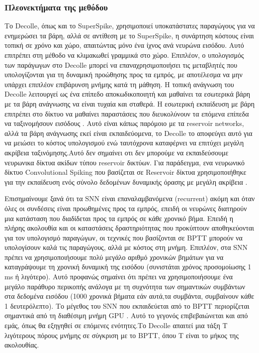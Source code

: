 \documentclass[12pt]{report}
\begin{document}
\subsubsection{Πλεονεκτήματα της μεθόδου}
Το \textlatin{Decolle}, όπως και το \textlatin{SuperSpike}, χρησιμοποιεί υποκατάστατες παραγώγους για να ενημερώσει τα βάρη, αλλά σε αντίθεση με το \textlatin{SuperSpike}, η συνάρτηση κόστους είναι τοπική σε χρόνο και χώρο, απαιτώντας μόνο ένα ίχνος ανά νευρώνα εισόδου. Αυτό επιτρέπει στη μέθοδο να κλιμακωθεί γραμμικά στο χώρο. Επιπλέον, ο υπολογισμός των παράγωγων στο Decolle μπορεί να επαναχρησιμοποιήσει τις μεταβλητές που υπολογίζονται για τη δυναμική προώθησης προς τα εμπρός, με αποτέλεσμα να μην υπάρχει επιπλέον επιβάρυνση μνήμης κατά τη μάθηση. Η τοπική ανάγνωση του Decolle λειτουργεί ως ένα επίπεδο αποκωδικοποιητή και μαθαίνει τα εσωτερικά βάρη με τα βάρη ανάγνωσης να είναι τυχαία και σταθερά. Η εσωτερική εκπαίδευση με βάρη επιτρέπει στο δίκτυο να μαθαίνει παραστάσεις που διευκολύνουν τα επόμενα επίπεδα να ταξινομήσουν εισόδους \cite{neftci2017}. Αυτό είναι κάπως παρόμοιο με τα reservoir networks, αλλά τα βάρη ανάγνωσης εκεί είναι εκπαιδεύομενα, το Decolle το αποφεύγει αυτό για να μειώσει το κόστος υπολογισμού ενώ ταυτόχρονα καταφέρνει να επιτύχει μεγάλη ακρίβεια ταξινόμησης.Αυτό δεν σημαίνει οτι δεν μπορούμε να εκπαιδεύσουμε νευρωνικα δίκτυα ακίδων τύπου \textlatin{reservoir} δικτύων. Για παράδειγμα, ενα νευρωνικό δίκτυο \textlatin{Convolutional Spiking} που βασίζεται σε \textlatin{Reservoir} δίκτυα χρησιμοποιήθηκε για την εκπαίδευση ενός σύνολο δεδομένων δυναμικής όρασης με μεγάλη ακρίβεια \cite{george2020}.

Επισημαίνουμε ξανά ότι τα \textlatin{SNN} είναι επαναλαμβανόμενα (\textlatin{recurrent}) ακόμη και όταν όλες οι συνδέσεις είναι προωθημένες προς τα εμπρός, επειδή οι νευρώνες διατηρούν μια κατάσταση που διαδίδεται προς τα εμπρός σε κάθε χρονικό βήμα. Επειδή η πλήρης ακολουθία και οι καταστάσεις δραστηριότητας που προκύπτουν αποθηκεύονται για τον υπολογισμό παραγώγων, οι τεχνικές που βασίζονται σε \textlatin{BPTT} μπορούν να υπολογίσουν καλά τις παραγώγους, αλλά με κόστος στη μνήμη. Επιπλέον, στα \textlatin{SNN} πρέπει να χρησιμοποιήσουμε πολύ μεγάλο αριθμό χρονικών βημάτων για να καταγράψουμε τη χρονική δυναμική της εισόδου (συνιστάται χρόνος προσομοίωσης 1 \textlatin{ms} ή λιγότερο). Αυτό προφανώς σημαίνει ότι πρέπει να χρησιμοποιήσουμε ένα μεγάλο παράθυρο περικοπής ανάλογα με τη συχνότητα των σημαντικών συμβάντων στα δεδομένα εισόδου (1000 χρονικά βήματα εάν αυτά,τα συμβάντα, συμβαίνουν κάθε 1 δευτερόλεπτο). Το μέγεθος του \textlatin{SNN} που εκπαιδεύεται από το \textlatin{BPTT} περιορίζεται σημαντικά από τη διαθέσιμη μνήμη \textlatin{GPU} \cite{ochard2018}. Αυτό το γεγονός επιβεβαιώνεται και από εμάς, όπως θα εξηγηθεί σε επόμενες ενότητες.Το \textlatin{Decolle} απαιτεί μια τάξη \textlatin{T} λιγότερους πόρους μνήμης σε σύγκριση με το \textlatin{BPTT}, όπου \textlatin{T} είναι το μήκος της ακολουθίας.
\end{document}
